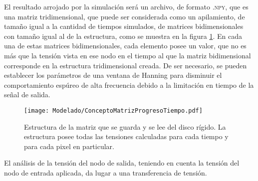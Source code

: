 El resultado arrojado por la simulación será un archivo, de formato \textsc{.npy}, que es una matriz tridimensional, que puede ser considerada como un apilamiento, de tamaño igual a la cantidad de tiempos simulados, de matrices bidimensionales con tamaño igual al de la estructura, como se muestra en la figura \ref{fig:EstructuraTiemposMatrizNumpy}. En cada una de estas matrices bidimensionales, cada elemento posee un valor, que no es más que la tensión vista en ese nodo en el tiempo al que la matriz bidimensional corresponde en la estructura tridimensional creada. De ser necesario, se pueden establecer los parámetros de una ventana de Hanning para disminuir el comportamiento espúreo de alta frecuencia debido a la limitación en tiempo de la señal de salida.

\begin{figure}[h]
	\centering
	\texttt{[image: Modelado/ConceptoMatrizProgresoTiempo.pdf]}
	\caption{Estructura de la matriz que se guarda y se lee del disco rígido. La estructura posee todas las tensiones calculadas para cada tiempo y para cada pixel en particular.}
	\label{fig:EstructuraTiemposMatrizNumpy}
\end{figure}

El análisis de la tensión del nodo de salida, teniendo en cuenta la tensión del nodo de entrada aplicada, da lugar a una transferencia de tensión.